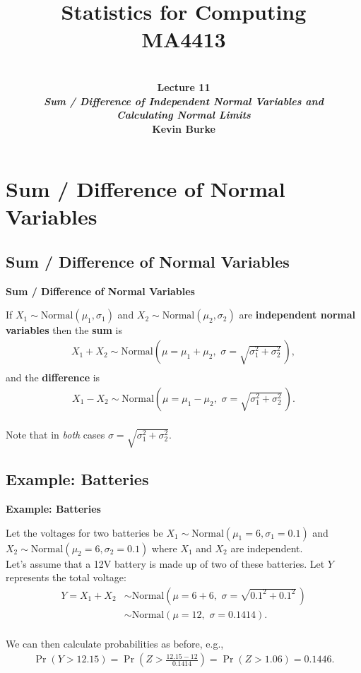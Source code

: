 \documentclass[compress]{beamer}        %
\title{{\huge Statistics for Computing\\[0.1cm]MA4413}}
\author[Kevin Burke]{{\bf\\[0.5cm]{\huge Lecture 11}\\[0.2cm]\emph{Sum / Difference of Independent Normal Variables and\\Calculating Normal Limits}\\[1.4cm]Kevin Burke}\\[0.3cm]\tcb{kevin.burke@ul.ie}}
\institute[University of Limerick, Maths \& Stats Dept]{}
\date{}
\makeatletter
\newcommand{\tcb}{\textcolor{beamer@blendedblue}}
\makeatother
\begin{document}
\begin{frame}[t]
\titlepage
\end{frame}



\section{Sum / Difference of Normal Variables}
\subsection{Sum / Difference of Normal Variables}
\begin{frame}{\bf \tcb{Sum / Difference of Normal Variables}}

If $X_1 \sim \text{Normal}(\mu_1,\sigma_1)$ and $X_2 \sim \text{Normal}(\mu_2,\sigma_2)$ are {\bf independent normal variables} then the {\bf sum} is\\
\begin{align*}
\boxed{X_1 + X_2 \sim \text{Normal}(\mu = \mu_1+ \mu_2,\,\, \sigma = \sqrt{\sigma_1^2+\sigma_2^2}\,)},\\
\end{align*}
and the {\bf difference} is\\
\begin{align*}
\boxed{X_1 - X_2 \sim \text{Normal}(\mu = \mu_1 - \mu_2,\,\, \sigma = \sqrt{\sigma_1^2+\sigma_2^2}\,)}.\\
\end{align*}

Note that in \emph{both} cases $\sigma = \sqrt{\sigma_1^2+\sigma_2^2}$.


\end{frame}



\subsection{Example: Batteries}
\begin{frame}{\bf \tcb{Example: Batteries}}

Let the voltages for two batteries be $X_1 \sim \text{Normal}(\mu_1=6,\sigma_1=0.1)$ and $X_2 \sim \text{Normal}(\mu_2=6,\sigma_2=0.1)$ where $X_1$ and $X_2$ are independent.\\[0.5cm]

Let's assume that a 12V battery is made up of two of these batteries. Let $Y$ represents the total voltage:
\begin{align*}
Y = X_1 + X_2 &\sim \text{Normal}(\mu = 6+ 6,\,\, \sigma = \sqrt{0.1^2+0.1^2}\,)\\[0.2cm]
&\sim \text{Normal}(\mu = 12,\,\, \sigma = 0.1414).\\
\end{align*}

We can then calculate probabilities as before, e.g.,
\begin{align*}
\Pr(Y > 12.15) = \Pr(Z > \tfrac{12.15-12}{0.1414}) = \Pr(Z > 1.06) = 0.1446.
\end{align*}



\end{frame}
\end{document}
